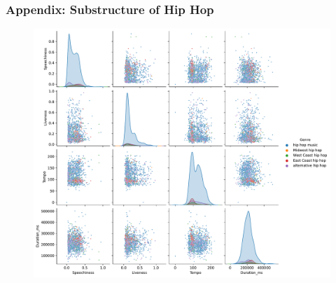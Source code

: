 \documentclass[8pt]{beamer}
\begin{document}
\begin{frame}
    \frametitle{Appendix: Substructure of Hip Hop}
    \begin{figure}
        \includegraphics[scale=0.3]{figures/pairplot_hip_v3.pdf}
    \end{figure}
\end{frame}
\end{document}
